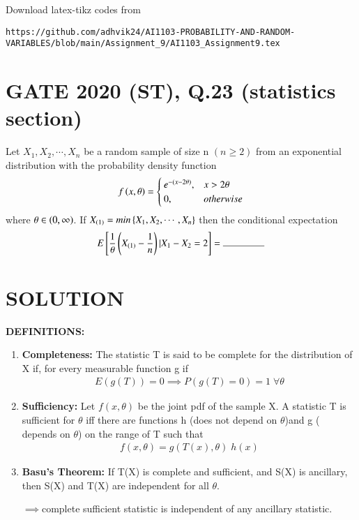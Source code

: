 \documentclass[journal,12pt,twocolumn]{IEEEtran}
\begin{document}
%
Download latex-tikz codes from 
%
\begin{lstlisting}
https://github.com/adhvik24/AI1103-PROBABILITY-AND-RANDOM-VARIABLES/blob/main/Assignment_9/AI1103_Assignment9.tex
\end{lstlisting}
\section{GATE 2020 (ST), Q.23 (statistics section)}
Let $X_1,X_2,\cdots,X_n$ be a random sample of size n $(n\ge2)$ from an exponential distribution with the probability density function
\begin{align}
f\left({x,\theta}\right)=
\begin{cases}
e^{-(x-2\theta)}, & x>2\theta
\\
0, & otherwise
\end{cases}
\end{align}
where $\theta\in\left(0,\infty\right)$. If $X_{(1)}=min\left\{X_1,X_2,\cdots,X_n\right\}$ then the conditional expectation 
\begin{align}
     \nonumber   \mean{\frac{1}{\theta}\brak{X_{(1)}-\frac{1}{n}}|X_1-X_2=2}=\rule{1.5cm}{0.15mm}
\end{align}
\section{SOLUTION}
\textbf{DEFINITIONS:}
\begin{enumerate}
    \item \textbf{Completeness: }The statistic T is said to be complete for the distribution of X if, for every measurable function g
    if 
    \begin{align}
        E(g(T))=0\implies P(g(T)=0)=1\;\forall\theta
    \end{align}
    \item\textbf{Sufficiency: }
    Let $f(x,\theta)$ be the joint pdf of the sample X. A statistic T is sufficient for $\theta$ iff there are functions h (does not depend on $\theta$)and g ( depends on $\theta$) on the range of T such that
\begin{align}
    f(x,\theta)=g(T(x),\theta)\;h(x)
\end{align}
    \item\textbf{Basu's Theorem: }
    If T(X) is complete and sufficient, and S(X) is ancillary, then S(X) and T(X) are independent for all $\theta$.
    
    $\implies$complete sufficient statistic is independent of any ancillary statistic.
\end{enumerate}
\end{document}

